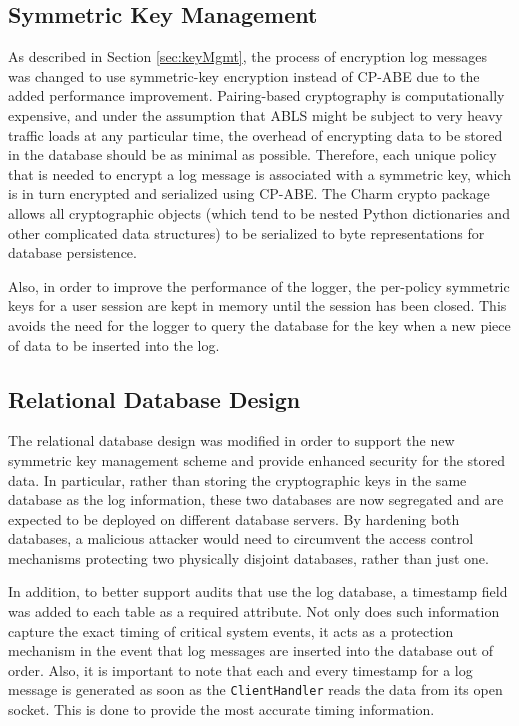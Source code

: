 \documentclass{sig-alternate}
\begin{document}
\subsection{Symmetric Key Management}
As described in Section \ref{sec:keyMgmt}, the process of encryption log messages was changed to use symmetric-key
encryption instead of CP-ABE due to the added performance improvement. Pairing-based cryptography is computationally
expensive, and under the assumption that ABLS might be subject to very heavy traffic loads at any particular time, the 
overhead of encrypting data to be stored in the database should be as minimal as possible. Therefore, each unique
policy that is needed to encrypt a log message is associated with a symmetric key, which is in turn encrypted and 
serialized using CP-ABE. The Charm crypto package allows all cryptographic objects (which tend to be nested
Python dictionaries and other complicated data structures) to be serialized to byte representations for database 
persistence. 

Also, in order to improve the performance of the logger, the per-policy symmetric keys for a user session are kept
in memory until the session has been closed. This avoids the need for the logger to query the database for the key 
when a new piece of data to be inserted into the log. 

\subsection{Relational Database Design}
The relational database design was modified in order to support the new symmetric key management scheme and provide 
enhanced security for the stored data. In particular, rather than storing the cryptographic keys in the same database as the
log information, these two databases are now segregated and are expected to be deployed on different database servers.
By hardening both databases, a malicious attacker would need to circumvent the access control mechanisms protecting
two physically disjoint databases, rather than just one. 

In addition, to better support audits that use the log database, a timestamp field was added to each table as a required
attribute. Not only does such information capture the exact timing of critical system events, it acts as a protection
mechanism in the event that log messages are inserted into the database out of order. Also, it is important to note that
each and every timestamp for a log message is generated as soon as the {\tt ClientHandler} reads the data from
its open socket. This is done to provide the most accurate timing information.
\end{document}
